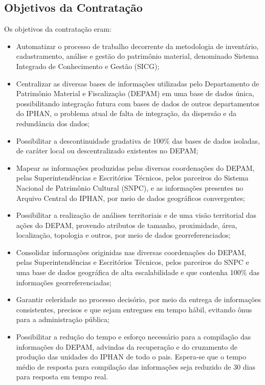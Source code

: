 \subsection[Objetivos da Contratação]{Objetivos da Contratação}

Os objetivos da contratação eram:

\begin{itemize}
\item Automatizar o processo de trabalho decorrente da metodologia de inventário, cadastramento, análise e gestão do patrimônio material, denominado Sistema Integrado de Conhecimento e Gestão (SICG);
\item Centralizar as diversas bases de informações utilizadas pelo Departamento de Patrimônio Material e Fiscalização (DEPAM) em uma base de dados única, possibilitando integração futura com bases de dados de outros departamentos do IPHAN,   o problema atual de falta de integração, da dispersão e da redundância dos dados;
\item Possibilitar a descontinuidade gradativa de 100\% das bases de dados isoladas, de caráter local ou descentralizado existentes no DEPAM;
\item Mapear as informações produzidas pelas diversas coordenações do DEPAM, pelas Superintendências e Escritórios Técnicos, pelos parceiros do Sistema Nacional de Patrimônio Cultural (SNPC), e as informações presentes no Arquivo Central do IPHAN, por meio de dados geográficos convergentes;
\item Possibilitar a realização de análises territoriais e de uma visão territorial das ações do DEPAM, provendo atributos de tamanho, proximidade, área, localização, topologia e outros, por meio de dados georreferenciados;
\item Consolidar informações originidas nas diversas coordenações do DEPAM, pelas Superintendências e Escritórios Técnicos, pelos parceiros do SNPC e uma base de dados geográfica de alta escalabilidade e que contenha 100\% das informações georreferenciadas;
\item Garantir celeridade no processo decisório, por meio da entrega de informações consistentes, precisos e que sejam entregues em tempo hábil, evitando ônus para a administração pública;
\item Possibilitar a redução do tempo e esforço necessário para a compilação das informações do DEPAM, advindas da recuperação e do cruzamento de produção das unidades do IPHAN de todo o pais. Espera-se que o tempo médio de resposta para compilação das informações seja reduzido de 30 dias para resposta em tempo real.
\end{itemize}


